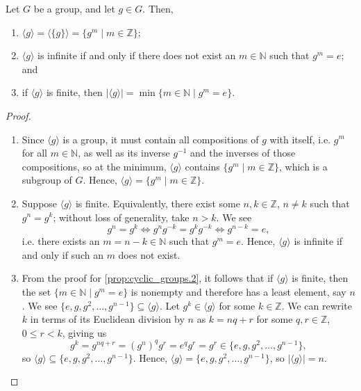 \begin{prop}
Let $ G $ be a group, and let $ g\in G $. Then,
\begin{enumerate}
    \item $ \langle g\rangle=\langle\{g\}\rangle=\{g^m\mid m\in\mathbb{Z}\} $;
    \item $ \langle g\rangle $ is infinite if and only if there does not exist an $ m\in\mathbb{N} $ such that $ g^m=e $; and \label{prop:cyclic_groups.2}
    \item if $ \langle g\rangle $ is finite, then $ \lvert\langle g\rangle\rvert=\min\{m\in\mathbb{N}\mid g^m=e\} $.
\end{enumerate}
\end{prop}
\begin{proof}~
\begin{enumerate}

\item Since $ \langle g\rangle $ is a group, it must contain all compositions of $ g $ with itself, i.e. $ g^m $ for all $ m\in\mathbb{N} $, as well as its inverse $ g^{-1} $ and the inverses of those compositions, so at the minimum, $ \langle g\rangle $ contains $ \{g^m\mid m\in\mathbb{Z}\} $, which is a subgroup of $ G $. Hence, $ \langle g\rangle=\{g^m\mid m\in\mathbb{Z}\} $.

\item Suppose $ \langle g\rangle $ is finite. Equivalently, there exist some $ n,k\in\mathbb{Z} $, $ n\neq k $ such that $ g^n=g^k $; without loss of generality, take $ n>k $. We see
\begin{equation*}
    g^n=g^k \iff g^ng^{-k}=g^kg^{-k} \iff g^{n-k}=e,
\end{equation*}
i.e. there exists an $ m=n-k\in\mathbb{N} $ such that $ g^m=e $. Hence, $ \langle g\rangle $ is infinite if and only if such an $ m $ does not exist.

\item From the proof for \ref{prop:cyclic_groups.2}, it follows that if $ \langle g\rangle $ is finite, then the set $ \{m\in\mathbb{N}\mid g^m=e\} $ is nonempty and therefore has a least element, say $ n $. We see $ \{e,g,g^2,\ldots,g^{n-1}\}\subseteq\langle g\rangle $. Let $ g^k\in\langle g\rangle $ for some $ k\in\mathbb{Z} $. We can rewrite $ k $ in terms of its Euclidean division by $ n $ as $ k=nq+r $ for some $ q,r\in\mathbb{Z} $, $ 0\leq r<k$, giving us
\begin{equation*}
    g^k=g^{nq+r}=(g^n)^qg^r=e^qg^r=g^r\in\{e,g,g^2,\ldots,g^{n-1}\},
\end{equation*}
so $ \langle g\rangle\subseteq\{e,g,g^2,\ldots,g^{n-1}\} $. Hence, $ \langle g\rangle=\{e,g,g^2,\ldots,g^{n-1}\} $, so $ \lvert\langle g\rangle\rvert=n $.\qedhere
    
\end{enumerate}
\end{proof}

